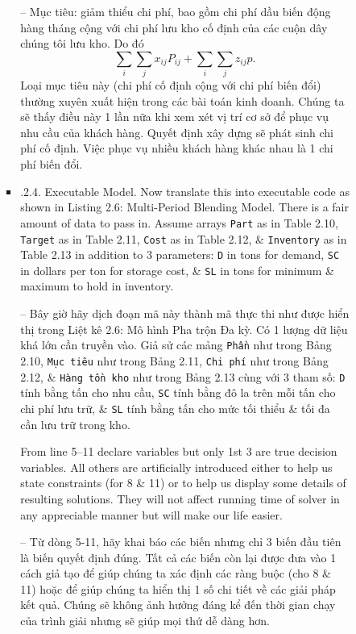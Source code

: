 \documentclass{article}
\begin{document}
\begin{itemize}
\begin{itemize}
\begin{itemize}
\begin{itemize}
                -- Mục tiêu: giảm thiểu chi phí, bao gồm chi phí dầu biến động hàng tháng cộng với chi phí lưu kho cố định của các cuộn dây chúng tôi lưu kho. Do đó
                \begin{equation*}
                    \sum_i\sum_j x_{ij}P_{ij} + \sum_i\sum_j z_{ij}p.
                \end{equation*}
                Loại mục tiêu này (chi phí cố định cộng với chi phí biến đổi) thường xuyên xuất hiện trong các bài toán kinh doanh. Chúng ta sẽ thấy điều này 1 lần nữa khi xem xét vị trí cơ sở để phục vụ nhu cầu của khách hàng. Quyết định xây dựng sẽ phát sinh chi phí cố định. Việc phục vụ nhiều khách hàng khác nhau là 1 chi phí biến đổi.
                \item {.2.4. Executable Model.} Now translate this into executable code as shown in {\sf Listing 2.6: Multi-Period Blending Model}. There is a fair amount of data to pass in. Assume arrays {\tt Part} as in Table 2.10, {\tt Target} as in Table 2.11, {\tt Cost} as in Table 2.12, \& {\tt Inventory} as in Table 2.13 in addition to 3 parameters: {\tt D} in tons for demand, {\tt SC} in dollars per ton for storage cost, \& {\tt SL} in tons for minimum \& maximum to hold in inventory.

                -- Bây giờ hãy dịch đoạn mã này thành mã thực thi như được hiển thị trong {\sf Liệt kê 2.6: Mô hình Pha trộn Đa kỳ}. Có 1 lượng dữ liệu khá lớn cần truyền vào. Giả sử các mảng {\tt Phần} như trong Bảng 2.10, {\tt Mục tiêu} như trong Bảng 2.11, {\tt Chi phí} như trong Bảng 2.12, \& {\tt Hàng tồn kho} như trong Bảng 2.13 cùng với 3 tham số: {\tt D} tính bằng tấn cho nhu cầu, {\tt SC} tính bằng đô la trên mỗi tấn cho chi phí lưu trữ, \& {\tt SL} tính bằng tấn cho mức tối thiểu \& tối đa cần lưu trữ trong kho.

                From line 5--11 declare variables but only 1st 3 are true decision variables. All others are artificially introduced either to help us state constraints (for 8 \& 11) or to help us display some details of resulting solutions. They will not affect running time of solver in any appreciable manner but will make our life easier.

                -- Từ dòng 5-11, hãy khai báo các biến nhưng chỉ 3 biến đầu tiên là biến quyết định đúng. Tất cả các biến còn lại được đưa vào 1 cách giả tạo để giúp chúng ta xác định các ràng buộc (cho 8 \& 11) hoặc để giúp chúng ta hiển thị 1 số chi tiết về các giải pháp kết quả. Chúng sẽ không ảnh hưởng đáng kể đến thời gian chạy của trình giải nhưng sẽ giúp mọi thứ dễ dàng hơn.


\end{itemize}
\end{itemize}
\end{itemize}
\end{itemize}
\end{document}
